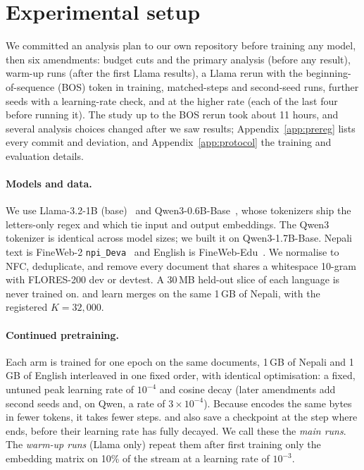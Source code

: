 \section{Experimental setup}
\label{sec:setup}

We committed an analysis plan to our own repository before training any model, then six amendments: budget cuts and the primary analysis (before any result), warm-up runs (after the first Llama results), a Llama rerun with the beginning-of-sequence (BOS) token in training, matched-steps and second-seed runs, further seeds with a learning-rate check, and \RO{} at the higher rate (each of the last four before running it). The study up to the BOS rerun took about 11 hours, and several analysis choices changed after we saw results; Appendix~\ref{app:prereg} lists every commit and deviation, and Appendix~\ref{app:protocol} the training and evaluation details.

\paragraph{Models and data.} We use Llama-3.2-1B (base)~\citep{grattafiori2024llama3} and Qwen3-0.6B-Base~\citep{yang2025qwen3}, whose tokenizers ship the letters-only regex and which tie input and output embeddings. The Qwen3 tokenizer is identical across model sizes; we built it on Qwen3-1.7B-Base. Nepali text is FineWeb-2 \texttt{npi\_Deva}~\citep{penedo2025fineweb2} and English is FineWeb-Edu~\citep{penedo2024fineweb}. We normalise to NFC, deduplicate, and remove every document that shares a whitespace 10-gram with FLORES-200 dev or devtest. A 30\,MB held-out slice of each language is never trained on. \RI{} and \RII{} learn merges on the same 1\,GB of Nepali, with the registered $K{=}32{,}000$.

\paragraph{Continued pretraining.} Each arm is trained for one epoch on the same documents, 1\,GB of Nepali and 1\,GB of English interleaved in one fixed order, with identical optimisation: a fixed, untuned peak learning rate of $10^{-4}$ and cosine decay (later amendments add second seeds and, on Qwen, a rate of $3{\times}10^{-4}$). Because \RII{} encodes the same bytes in fewer tokens, it takes fewer steps. \RO{} and \RI{} also save a checkpoint at the step where \RII{} ends, before their learning rate has fully decayed. We call these the \emph{main runs}. The \emph{warm-up runs} (Llama only) repeat them after first training only the embedding matrix on 10\% of the stream at a learning rate of $10^{-3}$.


